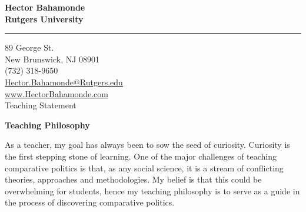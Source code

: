 \documentclass[11pt]{letter} %
\date{}
\begin{document}

\begin{letter}{} 


\begin{center}
\large\bf Hector Bahamonde \\ %
Rutgers University\\
\vspace{20pt} \hrule height 1pt %
89 George St. \\ New Brunswick, NJ 08901 \\ (732) 318-9650 \\ 
\href{mailto:hector.bahamonde@rutgers.edu}{Hector.Bahamonde@Rutgers.edu} \\
\href{http://www.hectorbahamonde.com}{www.HectorBahamonde.com}\\

{\huge\vspace{8mm} Teaching Statement}
\end{center} 

\signature{\vspace{1cm}h.b., fall 2016} %

\opening{} 
 
 {\bf Teaching Philosophy}

As a teacher, my goal has always been to sow the seed of curiosity. Curiosity is the first stepping stone of learning. One of the major challenges of teaching comparative politics is that, as any social science, it is a stream of conflicting theories, approaches and methodologies. My belief is that this could be overwhelming for students, hence my teaching philosophy is to serve as a guide in the process of discovering comparative politics.


\end{letter}
\end{document}
